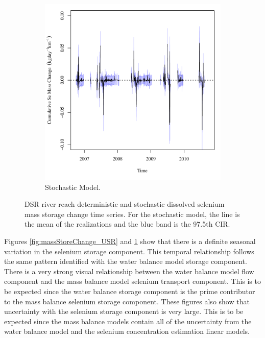 \begin{landscape}
\begin{figure}
\begin{subfigure}{0.7\textwidth}
			\includegraphics[width=\tableCustomSize]{"Figures/Results_DSR/Stochastic/Balance Mass - Storage"}
			\caption{Stochastic Model.}
		\end{subfigure}
		\caption[DSR river reach deterministic and stochastic dissolved selenium mass storage change time series.]{DSR river reach deterministic and stochastic dissolved selenium mass storage change time series.  For the stochastic model, the line is the mean of the realizations and the blue band is the 97.5th CIR.}
		\label{fig:massStoreChange_DSR}
	\end{figure}
\end{landscape}
\subfiguretop

Figures \ref{fig:massStoreChange_USR} and \ref{fig:massStoreChange_DSR} show that there is a definite seasonal variation in the selenium storage component.  This temporal relationship follows the same pattern identified with the water balance model storage component.  There is a very strong visual relationship between the water balance model flow component and the mass balance model selenium transport component.  This is to be expected since the water balance storage component is the prime contributor to the mass balance selenium storage component.  These figures also show that uncertainty with the selenium storage component is very large.  This is to be expected since the mass balance models contain all of the uncertainty from the water balance model and the selenium concentration estimation linear models.


